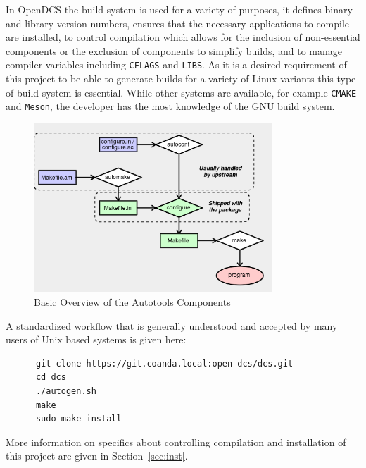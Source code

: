     In OpenDCS the build system is used for a variety of purposes, it defines
    binary and library version numbers, ensures that the necessary applications
    to compile are installed, to control compilation which allows for the
    inclusion of non-essential components or the exclusion of components to
    simplify builds, and to manage compiler variables including \texttt{CFLAGS}
    and \texttt{LIBS}. As it is a desired requirement of this project to be able
    to generate builds for a variety of Linux variants this type of build system
    is essential. While other systems are available, for example \texttt{CMAKE}
    and \texttt{Meson}, the developer has the most knowledge of the GNU build
    system.

    \begin{figure}[H]
      \includegraphics[width=0.8\textwidth,center]{figures/development/autotools-components}
      \caption{Basic Overview of the Autotools Components}\label{fig:dev-ac-comp}
    \end{figure}

    A standardized workflow that is generally understood and accepted by many
    users of Unix based systems is given here:

    \begin{lstlisting}
      git clone https://git.coanda.local:open-dcs/dcs.git
      cd dcs
      ./autogen.sh
      make
      sudo make install
    \end{lstlisting}

    More information on specifics about controlling compilation and installation
    of this project are given in Section~\ref{sec:inst}.

  \newpage


